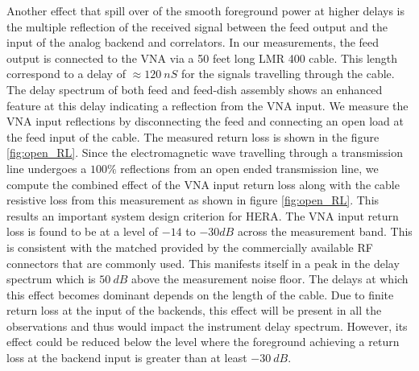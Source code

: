 \documentclass[twocolumn]{emulateapj}
\begin{document}
Another effect that spill over of the smooth foreground power at higher delays
is the multiple reflection of the received signal between the feed output and
the input of the analog backend and correlators. In our measurements, the feed
output is connected to the VNA via a 50 feet long LMR 400 cable. This length
correspond to a delay of $\approx 120~nS$ for the signals travelling through
the cable. The delay spectrum of both feed and feed-dish assembly shows an
enhanced feature at this delay indicating a reflection from the VNA input. We
measure the VNA input reflections by disconnecting the feed and connecting an
open load at the feed input of the cable. The measured return loss is shown in
the figure \ref{fig:open_RL}. Since the electromagnetic wave travelling through
a transmission line undergoes a $100\%$ reflections from an open ended
transmission line, we compute the combined effect of the VNA input return loss
along with the cable resistive loss from this measurement as shown in figure
\ref{fig:open_RL}. This results an important system design criterion for HERA.
The VNA input return loss is found to be at a level of $-14$ to $-30dB$ across
the measurement band. This is consistent with the matched provided by the
commercially available RF connectors that are commonly used. This manifests
itself in a peak in the delay spectrum which is $50~dB$ above the measurement
noise floor. The delays at which this effect becomes dominant depends on the
length of the cable. Due to finite return loss at the input of the backends,
this effect will be present in all the observations and thus would impact the
instrument delay spectrum. However, its effect could be reduced below the level
where the foreground  achieving a return loss at the backend input is greater
than at least $-30~dB$. 
\end{document}
